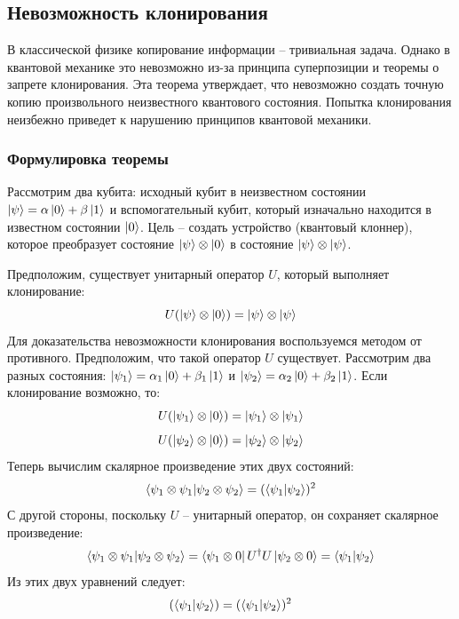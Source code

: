 \documentclass[12pt,a4paper]{article}
\begin{document}
	\subsection{Невозможность клонирования} 
	В классической физике копирование информации -- тривиальная задача. Однако в квантовой механике это невозможно из-за принципа суперпозиции и теоремы о запрете клонирования. Эта теорема утверждает, что невозможно создать точную копию произвольного неизвестного квантового состояния. Попытка клонирования неизбежно приведет к нарушению принципов квантовой механики.
	
	\subsubsection{Формулировка теоремы}
	
	Рассмотрим два кубита: исходный кубит в неизвестном состоянии $\ket{\psi} = \alpha\ket{0} + \beta\ket{1}$ и вспомогательный кубит, который изначально находится в известном состоянии $\ket{0}$. Цель -- создать устройство (квантовый клоннер), которое преобразует состояние $\ket{\psi} \otimes \ket{0}$ в состояние $\ket{\psi} \otimes \ket{\psi}$.
	
	Предположим, существует унитарный оператор $U$, который выполняет клонирование:
	\begin{equation}
		U (\ket{\psi} \otimes \ket{0}) = \ket{\psi} \otimes \ket{\psi}
	\end{equation}
	Для доказательства невозможности клонирования воспользуемся методом от противного. Предположим, что такой оператор $U$ существует. Рассмотрим два разных состояния: $\ket{\psi_1} = \alpha_1\ket{0} + \beta_1\ket{1}$ и $\ket{\psi_2} = \alpha_2\ket{0} + \beta_2\ket{1}$. Если клонирование возможно, то:
	\begin{equation}
		U (\ket{\psi_1}  \otimes \ket{0}) = \ket{\psi_1}  \otimes  \ket{\psi_1}
	\end{equation}
	\begin{equation}
		U (\ket{\psi_2}  \otimes \ket{0}) = \ket{\psi_2} \otimes  \ket{\psi_2}
	\end{equation}
	Теперь вычислим скалярное произведение этих двух состояний:
	\begin{equation}
		\braket{\psi_1 \otimes \psi_1}{\psi_2 \otimes \psi_2}=(\braket{\psi_1}{\psi_2})^{2}
	\end{equation}
	С другой стороны, поскольку $U$ -- унитарный оператор, он сохраняет скалярное произведение:
	\begin{equation}
		\braket{\psi_1 \otimes \psi_1}{\psi_2 \otimes \psi_2}=	\bra{\psi_1 \otimes 0}U^\dag U \ket{\psi_2 \otimes 0}=\braket{\psi_1}{\psi_2}
	\end{equation}
	Из этих двух уравнений следует:
	\begin{equation}
		(\braket{\psi_1}{\psi_2})=(\braket{\psi_1}{\psi_2})^{2}
	\end{equation}
	
\end{document}
